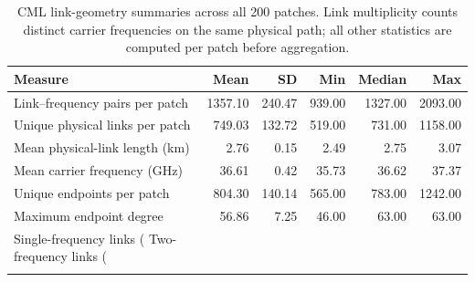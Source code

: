 \begin{table}[htbp]\centering\small\begin{tabular}{lrrrrr}
\toprule Measure & Mean & SD & Min & Median & Max \\
\midrule
Link--frequency pairs per patch & 1357.10 & 240.47 & 939.00 & 1327.00 & 2093.00 \\
Unique physical links per patch & 749.03 & 132.72 & 519.00 & 731.00 & 1158.00 \\
Mean physical-link length (km) & 2.76 & 0.15 & 2.49 & 2.75 & 3.07 \\
Mean carrier frequency (GHz) & 36.61 & 0.42 & 35.73 & 36.62 & 37.37 \\
Unique endpoints per patch & 804.30 & 140.14 & 565.00 & 783.00 & 1242.00 \\
Maximum endpoint degree & 56.86 & 7.25 & 46.00 & 63.00 & 63.00 \\
Single-frequency links (%
Two-frequency links (%
\\
\\
\bottomrule\end{tabular}
\caption{CML link-geometry summaries across all 200 patches. Link multiplicity counts distinct carrier frequencies on the same physical path; all other statistics are computed per patch before aggregation.}
\label{tab:link-geometry-200}
\end{table}
